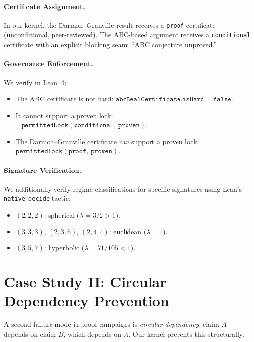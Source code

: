 \documentclass[runningheads]{llncs}
\begin{document}
\paragraph{Certificate Assignment.}
In our kernel, the Darmon--Granville result receives a \texttt{proof}
certificate (unconditional, peer-reviewed). The ABC-based argument receives a
\texttt{conditional} certificate with an explicit blocking seam: ``ABC
conjecture unproved.''

\paragraph{Governance Enforcement.}
We verify in Lean~4:
\begin{itemize}
\item The ABC certificate is not hard:
  $\texttt{abcBealCertificate}.\texttt{isHard} = \texttt{false}$.
\item It cannot support a proven lock:\\
  $\neg\, \texttt{permittedLock}(\texttt{conditional},\, \texttt{proven})$.
\item The Darmon--Granville certificate \emph{can} support a proven lock:\\
  $\texttt{permittedLock}(\texttt{proof},\, \texttt{proven})$.
\end{itemize}

\paragraph{Signature Verification.}
We additionally verify regime classifications for specific signatures using
Lean's \texttt{native\_decide} tactic:
\begin{itemize}
\item $(2,2,2)$: spherical ($\lambda = 3/2 > 1$).
\item $(3,3,3)$, $(2,3,6)$, $(2,4,4)$: euclidean ($\lambda = 1$).
\item $(3,5,7)$: hyperbolic ($\lambda = 71/105 < 1$).
\end{itemize}

\section{Case Study II: Circular Dependency Prevention}
\label{sec:case2}

A second failure mode in proof campaigns is \emph{circular dependency}: claim
$A$ depends on claim $B$, which depends on $A$. Our kernel prevents this
structurally.
\end{document}

